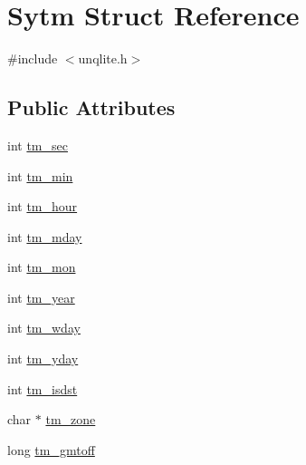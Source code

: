 \hypertarget{struct_sytm}{\section{Sytm Struct Reference}
\label{d9/dbb/struct_sytm}
}


{\ttfamily \#include $<$unqlite.\-h$>$}

\subsection*{Public Attributes}
\begin{DoxyCompactItemize}
\item 
int \hyperlink{struct_sytm_af4c2dd081e6b293221a678ecaae18a04}{tm\-\_\-sec}
\item 
int \hyperlink{struct_sytm_af05de1950d1dad912e1a6ad39c3977e1}{tm\-\_\-min}
\item 
int \hyperlink{struct_sytm_afe84b7656bd6817c9602b8cd89e5a449}{tm\-\_\-hour}
\item 
int \hyperlink{struct_sytm_a62a32b02ba2a90732855fdfb4354647a}{tm\-\_\-mday}
\item 
int \hyperlink{struct_sytm_af4d4e4e7102cd0ab3aca2147a4914c56}{tm\-\_\-mon}
\item 
int \hyperlink{struct_sytm_ab0bcd674d479bf65360d1c606883deb2}{tm\-\_\-year}
\item 
int \hyperlink{struct_sytm_a5ec4dcc908bc93d0aaaa0a35c1019885}{tm\-\_\-wday}
\item 
int \hyperlink{struct_sytm_a2cf36b4654391c5240bfc80c15c5b2cd}{tm\-\_\-yday}
\item 
int \hyperlink{struct_sytm_a41f4fdca4d7c634a116f1a599fc2d0d9}{tm\-\_\-isdst}
\item 
char $\ast$ \hyperlink{struct_sytm_aa13abfb106bb48e07583c1b1ebfc41f2}{tm\-\_\-zone}
\item 
long \hyperlink{struct_sytm_a880507d829e84e0dd39dd2d5a02d465c}{tm\-\_\-gmtoff}
\end{DoxyCompactItemize}


